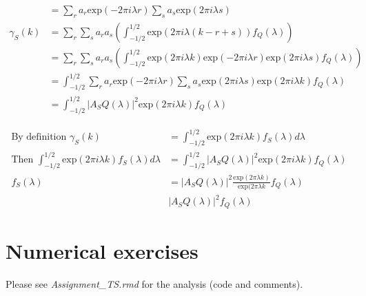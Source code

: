 \documentclass[10pt,a4paper]{article}
\begin{document}
\begin{enumerate}
\begin{enumerate}
\begin{align*}
			&= \sum_{r} a_r \text{exp}(-2\pi i \lambda r) \sum_{s} a_s \text{exp}(2\pi i \lambda s) \\			
			\gamma_{S}(k) &= \sum_{r} \sum_{s} a_r a_s (\int_{-1/2}^{1/2} \text{exp}(2\pi i \lambda (k-r+s)) f_Q(\lambda) ) \\			
			&= \sum_{r} \sum_{s} a_r a_s  (\int_{-1/2}^{1/2} \text{exp}(2\pi i \lambda k) \text{exp}(-2\pi i \lambda r) \text{exp}(2\pi i \lambda s) f_Q(\lambda) ) \\			
			&= \int_{-1/2}^{1/2} \sum_{r} a_r \text{exp}(-2\pi i \lambda r) \sum_{s} a_s \text{exp}(2\pi i \lambda s) \text{exp}(2\pi i \lambda k) f_Q(\lambda) \\			
			&= \int_{-1/2}^{1/2} |A_SQ(\lambda)|^2 \text{exp}(2\pi i \lambda k) f_Q(\lambda)
		\end{align*}
	
		\begin{align*}			
			\text{By definition   } \gamma_{S}(k) &= \int_{-1/2}^{1/2} \text{exp}(2\pi i \lambda k) f_S(\lambda) d\lambda \\
			\text{Then   } \int_{-1/2}^{1/2} \text{exp}(2\pi i \lambda k) f_S(\lambda) d\lambda &= \int_{-1/2}^{1/2} |A_SQ(\lambda)|^2 \text{exp}(2\pi i \lambda k) f_Q(\lambda)\\
			f_S(\lambda) &= |A_SQ(\lambda)|^2 \frac{\text{exp}(2\pi \lambda k)}{\text{exp}(2\pi \lambda k} f_Q(\lambda) \\
			&|A_SQ(\lambda)|^2 f_Q(\lambda)
		\end{align*}
	\end{enumerate}
\end{enumerate}
	\section{Numerical exercises}
	Please see \textit{Assignment\_TS.rmd} for the analysis (code and comments).
\end{document}
